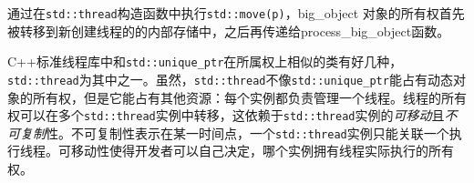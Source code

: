 通过在\texttt{std::thread}构造函数中执行\texttt{std::move(p)}，big\_object 对象的所有权首先被转移到新创建线程的的内部存储中，之后再传递给process\_big\_object函数。

C++标准线程库中和\texttt{std::unique\_ptr}在所属权上相似的类有好几种，\texttt{std::thread}为其中之一。虽然，\texttt{std::thread}不像\texttt{std::unique\_ptr}能占有动态对象的所有权，但是它能占有其他资源：每个实例都负责管理一个线程。线程的所有权可以在多个\texttt{std::thread}实例中转移，这依赖于\texttt{std::thread}实例的\textit{可移动}且\textit{不可复制}性。不可复制性表示在某一时间点，一个\texttt{std::thread}实例只能关联一个执行线程。可移动性使得开发者可以自己决定，哪个实例拥有线程实际执行的所有权。